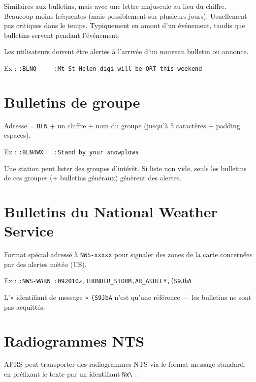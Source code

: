 Similaires aux bulletins, mais avec une lettre majuscule au lieu du
chiffre. Beaucoup moins fréquentes (mais possiblement sur plusieurs
jours). Usuellement pas critiques dans le temps. Typiquement en amont
d'un événement, tandis que bulletins servent pendant l'événement.

Les utilisateurs doivent être alertés à l'arrivée d'un nouveau bulletin
ou annonce.

Ex :
\texttt{:BLNQ\ \ \ \ \ :Mt\ St\ Helen\ digi\ will\ be\ QRT\ this\ weekend}

\section{Bulletins de groupe}\label{bulletins-de-groupe}

Adresse = \texttt{BLN} + un chiffre + nom du groupe (jusqu'à 5
caractères + padding espaces).

Ex : \texttt{:BLN4WX\ \ \ :Stand\ by\ your\ snowplows}

Une station peut lister des groupes d'intérêt. Si liste non vide, seuls
les bulletins de ces groupes (+ bulletins généraux) génèrent des
alertes.

\section{Bulletins du National Weather
Service}\label{bulletins-du-national-weather-service}

Format spécial adressé à \texttt{NWS-xxxxx} pour signaler des zones de
la carte concernées par des alertes météo (US).

Ex : \texttt{:NWS-WARN\ :092010z,THUNDER\_STORM,AR\_ASHLEY,\{S9JbA}

L'« identifiant de message » \texttt{\{S9JbA} n'est qu'une référence ---
les bulletins ne sont pas acquittés.

\section{Radiogrammes NTS}\label{radiogrammes-nts}

APRS peut transporter des radiogrammes NTS via le format message
standard, en préfixant le texte par un identifiant
\texttt{Nx\textbackslash{}} :

